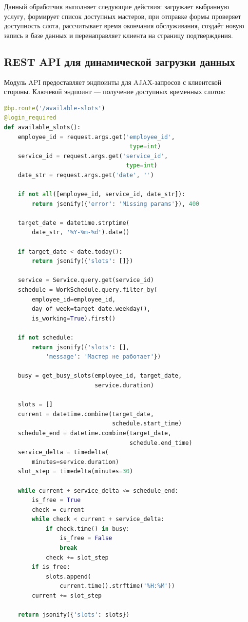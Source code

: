 \documentclass[14pt,a4paper,oneside]{extarticle}
\begin{document}
Данный обработчик выполняет следующие действия: загружает выбранную услугу, формирует список доступных мастеров, при отправке формы проверяет доступность слота, рассчитывает время окончания обслуживания, создаёт новую запись в базе данных и перенаправляет клиента на страницу подтверждения.

\subsection{REST API для динамической загрузки данных}

Модуль API предоставляет эндпоинты для AJAX-запросов с клиентской стороны. Ключевой эндпоинт --- получение доступных временных слотов:

\begin{lstlisting}[language=Python, caption={API получения доступных слотов (api/routes.py)}, label={lst:api_slots}]
@bp.route('/available-slots')
@login_required
def available_slots():
    employee_id = request.args.get('employee_id',
                                    type=int)
    service_id = request.args.get('service_id',
                                   type=int)
    date_str = request.args.get('date', '')

    if not all([employee_id, service_id, date_str]):
        return jsonify({'error': 'Missing params'}), 400

    target_date = datetime.strptime(
        date_str, '%Y-%m-%d').date()

    if target_date < date.today():
        return jsonify({'slots': []})

    service = Service.query.get(service_id)
    schedule = WorkSchedule.query.filter_by(
        employee_id=employee_id,
        day_of_week=target_date.weekday(),
        is_working=True).first()

    if not schedule:
        return jsonify({'slots': [],
            'message': 'Мастер не работает'})

    busy = get_busy_slots(employee_id, target_date,
                          service.duration)

    slots = []
    current = datetime.combine(target_date,
                               schedule.start_time)
    schedule_end = datetime.combine(target_date,
                                    schedule.end_time)
    service_delta = timedelta(
        minutes=service.duration)
    slot_step = timedelta(minutes=30)

    while current + service_delta <= schedule_end:
        is_free = True
        check = current
        while check < current + service_delta:
            if check.time() in busy:
                is_free = False
                break
            check += slot_step
        if is_free:
            slots.append(
                current.time().strftime('%H:%M'))
        current += slot_step

    return jsonify({'slots': slots})
\end{lstlisting}
\end{document}
